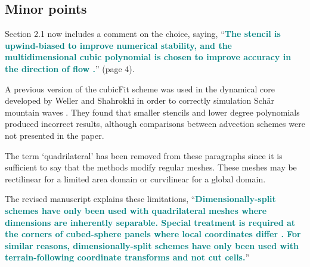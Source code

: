 \documentclass[times]{elsarticle}
\newcommand{\revtwo}[1]{\textcolor{teal}{\textbf{#1}}}
\begin{document}
\subsection*{Minor points}

\begin{quotation}
\begin{comment}
\item It would be interesting to know if there was some rationale for the choice of
the polynomial (5) and the stencil discussed in  section 2.1.1. Given that the scheme
is second order convergent, might it be possible to use a lower degree polynomial
and smaller stencil?
\end{comment}
\end{quotation}
Section 2.1 now includes a comment on the choice, saying, ``\revtwo{The stencil is upwind-biased to improve numerical stability, and the multidimensional cubic polynomial is chosen to improve accuracy in the direction of flow \citep{leonard1993}.}'' (page 4).

A previous version of the cubicFit scheme was used in the dynamical core developed by Weller and Shahrokhi \citep{weller-shahrokhi2014} in order to correctly simulation Sch\"ar mountain waves \citep{schaer2002}.  They found that smaller stencils and lower degree polynomials produced incorrect results, although comparisons between advection schemes were not presented in the paper.

\begin{quotation}
\begin{comment}
\item The first two paragraphs on p2 refer to quadrilateral meshes. It seems the discussion
has slipped into the 2D vertical slice case without explicitly saying so.
\end{comment}
\end{quotation}
The term `quadrilateral' has been removed from these paragraphs since it is sufficient to say that the methods modify regular meshes.  These meshes may be rectilinear for a limited area domain or curvilinear for a global domain.

\begin{quotation}
\begin{comment}
\item P2, 5th paragraph. Perhaps mention that dimensionally-split schemes are only possible
when the grid permits it (e.g.\ not a hexagonal grid).
\end{comment}
\end{quotation}
The revised manuscript explains these limitations, ``\revtwo{Dimensionally-split schemes have only been used with quadrilateral meshes where dimensions are inherently separable.  Special treatment is required at the corners of cubed-sphere panels where local coordinates differ \citep{putman-lin2007,katta2015}.
For similar reasons, dimensionally-split schemes have only been used with terrain-following coordinate transforms and not cut cells.}''
\end{document}
